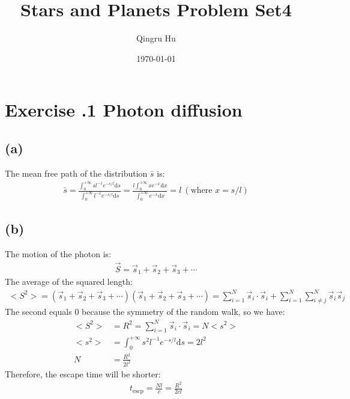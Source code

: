 \documentclass[a4paper,12pt]{article}
\title{\textbf{Stars and Planets Problem Set4}}
\author{Qingru Hu}
\date{\today}
\renewcommand{\d}{\mathrm{d}}
\begin{document}
\maketitle
\section*{\textbf{Exercise \uppercase\expandafter{}.1 Photon diffusion}}
\subsection*{(a)}
The mean free path of the distribution $\bar{s}$ is:
\begin{align*}
    \bar{s} = \frac{\int_{0}^{+\infty} s l^{-1} e^{-s/l} \d s}{\int_{0}^{+\infty} l^{-1} e^{-s/l} \d s} = 
    \frac{l \int_{0}^{+\infty} x e^{-x} \d x}{\int_{0}^{+\infty} e^{-x} \d x}
    = l \ (\text{where } x = s/l)
\end{align*}


\subsection*{(b)}
The motion of the photon is:
\begin{align*}
    \vec{S} = \vec{s}_1 + \vec{s}_2 + \vec{s}_3 + \cdots
\end{align*}
The average of the squared length:
\begin{align*}
    <S^2> = (\vec{s}_1 + \vec{s}_2 + \vec{s}_3 + \cdots)(\vec{s}_1 + \vec{s}_2 + \vec{s}_3 + \cdots) 
    = \sum_{i=1}^N \vec{s}_i \cdot \vec{s}_i + \sum_{i=1}^N \sum_{i\neq j}^N \vec{s}_i \vec{s}_j
\end{align*}
The second equals 0 because the symmetry of the random walk, so we have:
\begin{align*}
    <S^2> &= R^2 = \sum_{i=1}^N \vec{s}_i \cdot \vec{s}_i = N <s^2> \\
    <s^2> &= \int_{0}^{+\infty} s^2  l^{-1} e^{-s/l} \d s = 2l^2 \\
    N &= \frac{R^2}{2 l^2}
\end{align*}
Therefore, the escape time will be shorter:
\begin{align*}
    t_\text{escp} = \frac{N l}{c} = \frac{R^2}{2cl}
\end{align*}
\end{document}
